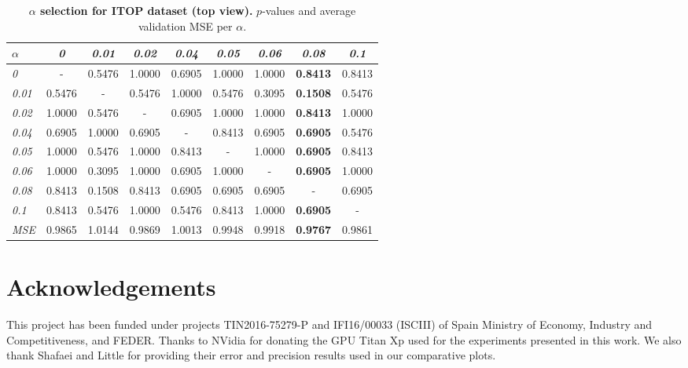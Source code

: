 \documentclass[review,12pt,3p]{elsarticle}
\begin{document}
\begin{table}[t]
\caption{\textbf{$\alpha$ selection for ITOP dataset (top view).} $p$-values and average validation MSE per $\alpha$.}
\label{tab:statsAL1iTOPtview}
\scriptsize %
\begin{center}
\setlength{\tabcolsep}{0.2em} %
\begin{tabular}{|l|c c c c c c c c |}
\hline
 $\alpha$ &\emph{0}& \emph{0.01} & \emph{0.02}& \emph{0.04}& \emph{0.05}& \emph{0.06}& \emph{0.08}& \emph{0.1}\\
  \hline \emph{0} & - & 0.5476 & 1.0000 & 0.6905 & 1.0000 & 1.0000 & \textbf{0.8413} & 0.8413  \\
  \hline \emph{0.01} & 0.5476 & - & 0.5476 & 1.0000 & 0.5476 & 0.3095 & \textbf{0.1508} & 0.5476  \\
  \hline \emph{0.02} & 1.0000 & 0.5476 & - & 0.6905 & 1.0000 & 1.0000 & \textbf{0.8413} & 1.0000  \\
  \hline \emph{0.04} & 0.6905 & 1.0000 & 0.6905 & - & 0.8413 & 0.6905 & \textbf{0.6905} & 0.5476  \\
  \hline \emph{0.05} & 1.0000 & 0.5476 & 1.0000 & 0.8413 & - & 1.0000 & \textbf{0.6905} & 0.8413  \\
  \hline \emph{0.06} & 1.0000 & 0.3095 & 1.0000 & 0.6905 & 1.0000 & - & \textbf{0.6905} & 1.0000  \\
  \hline \emph{0.08} & 0.8413 & 0.1508 & 0.8413 & 0.6905 & 0.6905 & 0.6905 & - & 0.6905  \\
  \hline \emph{0.1} & 0.8413 & 0.5476 & 1.0000 & 0.5476 & 0.8413 & 1.0000 & \textbf{0.6905} & -  \\
\hline 
\hline
\textit{MSE} & 0.9865  &  1.0144    &0.9869  &  1.0013  &  0.9948 &   0.9918&    \textbf{0.9767}&    0.9861\\
\hline
\end{tabular} 
\end{center}
\end{table}



\section*{Acknowledgements}
This project has been funded under projects TIN2016-75279-P and IFI16/00033 (ISCIII) of Spain Ministry of Economy, Industry and Competitiveness, and FEDER.
Thanks to NVidia for donating the GPU Titan Xp used for the experiments presented in this work.
We also thank Shafaei and Little for providing their error and precision results used in our comparative plots.

\clearpage





\end{document}
